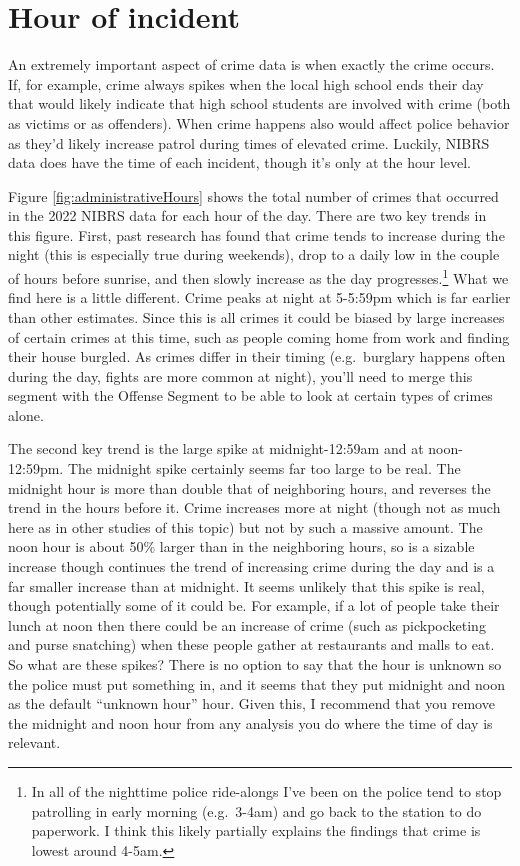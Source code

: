 \documentclass[
]{krantz}
\begin{document}
\section{Hour of incident}\label{hour-of-incident}

An extremely important aspect of crime data is when exactly
the crime occurs. If, for example, crime always spikes when
the local high school ends their day that would likely
indicate that high school students are involved with crime
(both as victims or as offenders). When crime happens also
would affect police behavior as they'd likely increase
patrol during times of elevated crime. Luckily, NIBRS data
does have the time of each incident, though it's only at the
hour level.

Figure \ref{fig:administrativeHours} shows the total number
of crimes that occurred in the 2022 NIBRS data for each hour
of the day. There are two key trends in this figure. First,
past research has found that crime tends to increase during
the night (this is especially true during weekends), drop to
a daily low in the couple of hours before sunrise, and then
slowly increase as the day progresses.\footnote{In all of
  the nighttime police ride-alongs I've been on the police
  tend to stop patrolling in early morning (e.g.~3-4am) and
  go back to the station to do paperwork. I think this
  likely partially explains the findings that crime is
  lowest around 4-5am.} What we find here is a little
different. Crime peaks at night at 5-5:59pm which is far
earlier than other estimates. Since this is all crimes it
could be biased by large increases of certain crimes at this
time, such as people coming home from work and finding their
house burgled. As crimes differ in their timing
(e.g.~burglary happens often during the day, fights are more
common at night), you'll need to merge this segment with the
Offense Segment to be able to look at certain types of
crimes alone.

The second key trend is the large spike at midnight-12:59am
and at noon-12:59pm. The midnight spike certainly seems far
too large to be real. The midnight hour is more than double
that of neighboring hours, and reverses the trend in the
hours before it. Crime increases more at night (though not
as much here as in other studies of this topic) but not by
such a massive amount. The noon hour is about 50\% larger
than in the neighboring hours, so is a sizable increase
though continues the trend of increasing crime during the
day and is a far smaller increase than at midnight. It seems
unlikely that this spike is real, though potentially some of
it could be. For example, if a lot of people take their
lunch at noon then there could be an increase of crime (such
as pickpocketing and purse snatching) when these people
gather at restaurants and malls to eat. So what are these
spikes? There is no option to say that the hour is unknown
so the police must put something in, and it seems that they
put midnight and noon as the default ``unknown hour'' hour.
Given this, I recommend that you remove the midnight and
noon hour from any analysis you do where the time of day is
relevant.
\end{document}
